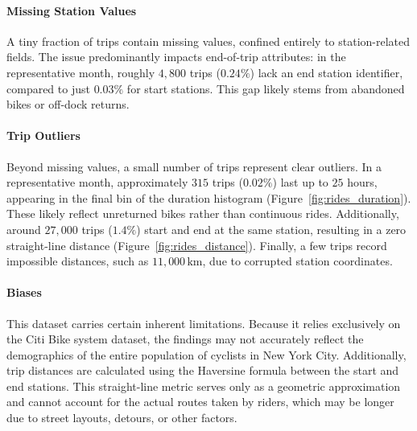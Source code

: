 \paragraph{Missing Station Values}
A tiny fraction of trips contain missing values, confined entirely to station-related fields.
The issue predominantly impacts end-of-trip attributes: in the representative month, roughly $4{,}800$ trips ($0.24\%$) lack an end station identifier, compared to just $0.03\%$ for start stations.
This gap likely stems from abandoned bikes or off-dock returns.

\paragraph{Trip Outliers}
Beyond missing values, a small number of trips represent clear outliers. 
In a representative month, approximately $315$ trips ($0.02\%$) last up to $25$ hours, appearing in the final bin of the duration histogram (Figure~\ref{fig:rides_duration}). 
These likely reflect unreturned bikes rather than continuous rides. 
Additionally, around $27{,}000$ trips ($1.4\%$) start and end at the same station, resulting in a zero straight-line distance (Figure~\ref{fig:rides_distance}). 
Finally, a few trips record impossible distances, such as $11{,}000\,\text{km}$, due to corrupted station coordinates.

\paragraph{Biases}
This dataset carries certain inherent limitations.
Because it relies exclusively on the Citi Bike system dataset, the findings may not accurately reflect the demographics of the entire population of cyclists in New York City.
Additionally, trip distances are calculated using the Haversine formula between the start and end stations.
This straight-line metric serves only as a geometric approximation and cannot account for the actual routes taken by riders, which may be longer due to street layouts, detours, or other factors.
